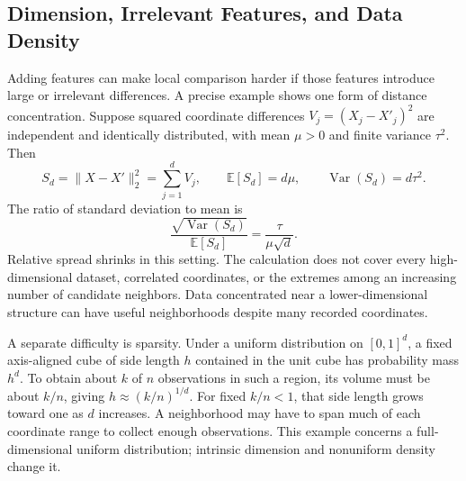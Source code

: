 \subsection{Dimension, Irrelevant Features, and Data Density}

Adding features can make local comparison harder if those features introduce large or irrelevant differences. A precise example shows one form of distance concentration. Suppose squared coordinate differences $V_j=(X_j-X'_j)^2$ are independent and identically distributed, with mean $\mu>0$ and finite variance $\tau^2$. Then
\[
S_d=\|X-X'\|_2^2=\sum_{j=1}^d V_j,
\qquad \mathbb E[S_d]=d\mu,\qquad
\operatorname{Var}(S_d)=d\tau^2.
\]
The ratio of standard deviation to mean is
\[
\frac{\sqrt{\operatorname{Var}(S_d)}}{\mathbb E[S_d]}
=\frac{\tau}{\mu\sqrt d}.
\]
Relative spread shrinks in this setting. The calculation does not cover every high-dimensional dataset, correlated coordinates, or the extremes among an increasing number of candidate neighbors. Data concentrated near a lower-dimensional structure can have useful neighborhoods despite many recorded coordinates.

\par\addvspace{\intextsep}\noindent\begin{minipage}{\linewidth}
\centering
{}
\label{fig:distance-concentration}
\end{minipage}\par\addvspace{\intextsep}

A separate difficulty is sparsity. Under a uniform distribution on $[0,1]^d$, a fixed axis-aligned cube of side length $h$ contained in the unit cube has probability mass $h^d$. To obtain about $k$ of $n$ observations in such a region, its volume must be about $k/n$, giving $h\approx(k/n)^{1/d}$. For fixed $k/n<1$, that side length grows toward one as $d$ increases. A neighborhood may have to span much of each coordinate range to collect enough observations. This example concerns a full-dimensional uniform distribution; intrinsic dimension and nonuniform density change it.

